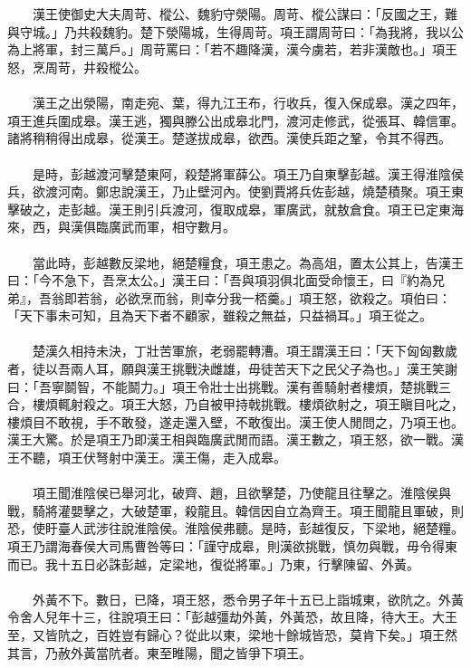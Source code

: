 \\\\
　　漢王使御史大夫周苛、樅公、魏豹守滎陽。周苛、樅公謀曰：「反國之王，難與守城。」乃共殺魏豹。楚下滎陽城，生得周苛。項王謂周苛曰：「為我將，我以公為上將軍，封三萬戶。」周苛罵曰：「若不趣降漢，漢今虜若，若非漢敵也。」項王怒，烹周苛，井殺樅公。
\\\\
　　漢王之出滎陽，南走宛、葉，得九江王布，行收兵，復入保成皋。漢之四年，項王進兵圍成皋。漢王逃，獨與滕公出成皋北門，渡河走修武，從張耳、韓信軍。諸將稍稍得出成皋，從漢王。楚遂拔成皋，欲西。漢使兵距之鞏，令其不得西。
\\\\
　　是時，彭越渡河擊楚東阿，殺楚將軍薛公。項王乃自東擊彭越。漢王得淮陰侯兵，欲渡河南。鄭忠說漢王，乃止壁河內。使劉賈將兵佐彭越，燒楚積聚。項王東擊破之，走彭越。漢王則引兵渡河，復取成皋，軍廣武，就敖倉食。項王已定東海來，西，與漢俱臨廣武而軍，相守數月。
\\\\
　　當此時，彭越數反梁地，絕楚糧食，項王患之。為高俎，置太公其上，告漢王曰：「今不急下，吾烹太公。」漢王曰：「吾與項羽俱北面受命懷王，曰『約為兄弟』，吾翁即若翁，必欲烹而翁，則幸分我一桮羹。」項王怒，欲殺之。項伯曰：「天下事未可知，且為天下者不顧家，雖殺之無益，只益禍耳。」項王從之。
\\\\
　　楚漢久相持未決，丁壯苦軍旅，老弱罷轉漕。項王謂漢王曰：「天下匈匈數歲者，徒以吾兩人耳，願與漢王挑戰決雌雄，毋徒苦天下之民父子為也。」漢王笑謝曰：「吾寧鬬智，不能鬬力。」項王令壯士出挑戰。漢有善騎射者樓煩，楚挑戰三合，樓煩輒射殺之。項王大怒，乃自被甲持戟挑戰。樓煩欲射之，項王瞋目叱之，樓煩目不敢視，手不敢發，遂走還入壁，不敢復出。漢王使人閒問之，乃項王也。漢王大驚。於是項王乃即漢王相與臨廣武閒而語。漢王數之，項王怒，欲一戰。漢王不聽，項王伏弩射中漢王。漢王傷，走入成皋。
\\\\
　　項王聞淮陰侯已舉河北，破齊、趙，且欲擊楚，乃使龍且往擊之。淮陰侯與戰，騎將灌嬰擊之，大破楚軍，殺龍且。韓信因自立為齊王。項王聞龍且軍破，則恐，使盱臺人武涉往說淮陰侯。淮陰侯弗聽。是時，彭越復反，下梁地，絕楚糧。項王乃謂海春侯大司馬曹咎等曰：「謹守成皋，則漢欲挑戰，慎勿與戰，毋令得東而已。我十五日必誅彭越，定梁地，復從將軍。」乃東，行擊陳留、外黃。
\\\\
　　外黃不下。數日，已降，項王怒，悉令男子年十五已上詣城東，欲阬之。外黃令舍人兒年十三，往說項王曰：「彭越彊劫外黃，外黃恐，故且降，待大王。大王至，又皆阬之，百姓豈有歸心？從此以東，梁地十餘城皆恐，莫肯下矣。」項王然其言，乃赦外黃當阬者。東至睢陽，聞之皆爭下項王。
